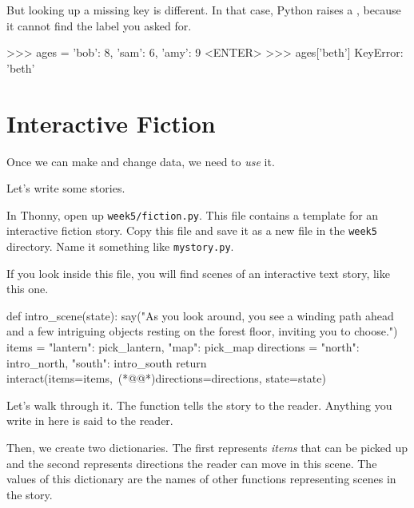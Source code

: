 But looking up a missing key is different. In that case, Python raises a , because it cannot find the label you asked for.

\begin{replbox}
>>> ages = { 'bob': 8, 'sam': 6, 'amy': 9 }<ENTER>
>>> ages['beth']
KeyError: 'beth'
\end{replbox}

\section{Interactive Fiction}

Once we can make and change data, we need to \emph{use} it.

Let's write some stories.

In Thonny, open up \texttt{week5/fiction.py}. This file contains a template for an interactive
fiction story. Copy this file and save it as a new file in the \texttt{week5} directory. Name it
something like \texttt{mystory.py}.

If you look inside this file, you will find scenes of an interactive text story, like this one.

\begin{replbox}
def intro_scene(state):
    say("As you look around, you see a winding path ahead and a few intriguing objects resting on the forest floor, inviting you to choose.")
    items = {
        "lantern": pick_lantern,
        "map": pick_map
    }
    directions = {
        "north": intro_north,
        "south": intro_south
    }
    return interact(items=items,\
        (*@@*)directions=directions, state=state)
\end{replbox}

Let's walk through it. The  function tells the story to the reader. Anything you write in
here is said to the reader.

Then, we create two dictionaries. The first represents \emph{items} that can be picked up and the
second represents directions the reader can move in this scene. The values of this dictionary are
the names of other functions representing scenes in the story.

